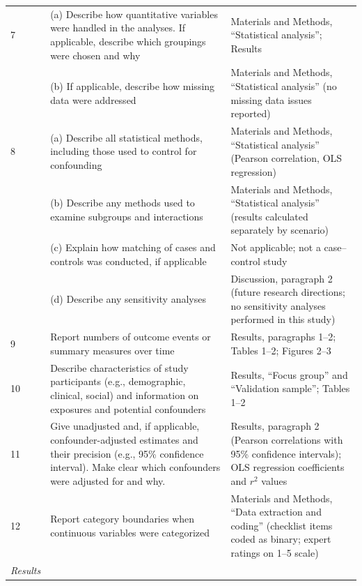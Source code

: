 \documentclass{article}
\begin{document}
\begin{table}[h]
\begin{tabular}{p{}p{}p{}}
7 & (a) Describe how quantitative variables were handled in the analyses. If applicable, describe which groupings were chosen and why & Materials and Methods, ``Statistical analysis''; Results \\
  & (b) If applicable, describe how missing data were addressed & Materials and Methods, ``Statistical analysis'' (no missing data issues reported) \\

8 & (a) Describe all statistical methods, including those used to control for confounding & Materials and Methods, ``Statistical analysis'' (Pearson correlation, OLS regression) \\
  & (b) Describe any methods used to examine subgroups and interactions & Materials and Methods, ``Statistical analysis'' (results calculated separately by scenario) \\
  & (c) Explain how matching of cases and controls was conducted, if applicable & Not applicable; not a case--control study \\
  & (d) Describe any sensitivity analyses & Discussion, paragraph 2 (future research directions; no sensitivity analyses performed in this study) \\

9 & Report numbers of outcome events or summary measures over time & Results, paragraphs 1--2; Tables 1--2; Figures 2--3 \\

10 & Describe characteristics of study participants (e.g., demographic, clinical, social) and information on exposures and potential confounders & Results, ``Focus group'' and ``Validation sample''; Tables 1--2 \\

11 & Give unadjusted and, if applicable, confounder-adjusted estimates and their precision (e.g., 95\% confidence interval). Make clear which confounders were adjusted for and why. & Results, paragraph 2 (Pearson correlations with 95\% confidence intervals); OLS regression coefficients and $r^{2}$ values \\

12 & Report category boundaries when continuous variables were categorized & Materials and Methods, ``Data extraction and coding'' (checklist items coded as binary; expert ratings on 1--5 scale) \\

\midrule
\textit{Results} & & \\
\midrule


\end{tabular}
\end{table}
\end{document}
